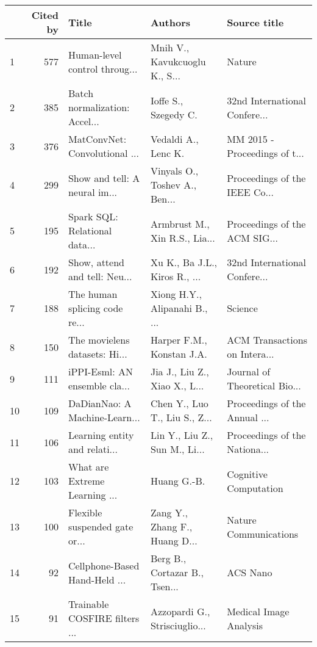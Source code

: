 \begin{tabular}{lrlll}
\toprule
{} &  Cited by &                          Title &                        Authors &                   Source title \\
\midrule
1  &       577 &  Human-level control throug... &  Mnih V., Kavukcuoglu K., S... &                         Nature \\
2  &       385 &  Batch normalization: Accel... &           Ioffe S., Szegedy C. &  32nd International Confere... \\
3  &       376 &  MatConvNet: Convolutional ... &            Vedaldi A., Lenc K. &  MM 2015 - Proceedings of t... \\
4  &       299 &  Show and tell: A neural im... &  Vinyals O., Toshev A., Ben... &  Proceedings of the IEEE Co... \\
5  &       195 &  Spark SQL: Relational data... &  Armbrust M., Xin R.S., Lia... &  Proceedings of the ACM SIG... \\
6  &       192 &  Show, attend and tell: Neu... &  Xu K., Ba J.L., Kiros R., ... &  32nd International Confere... \\
7  &       188 &  The human splicing code re... &  Xiong H.Y., Alipanahi B., ... &                        Science \\
8  &       150 &  The movielens datasets: Hi... &      Harper F.M., Konstan J.A. &  ACM Transactions on Intera... \\
9  &       111 &  iPPI-Esml: AN ensemble cla... &  Jia J., Liu Z., Xiao X., L... &  Journal of Theoretical Bio... \\
10 &       109 &  DaDianNao: A Machine-Learn... &  Chen Y., Luo T., Liu S., Z... &  Proceedings of the Annual ... \\
11 &       106 &  Learning entity and relati... &  Lin Y., Liu Z., Sun M., Li... &  Proceedings of the Nationa... \\
12 &       103 &  What are Extreme Learning ... &                    Huang G.-B. &          Cognitive Computation \\
13 &       100 &  Flexible suspended gate or... &  Zang Y., Zhang F., Huang D... &          Nature Communications \\
14 &        92 &  Cellphone-Based Hand-Held ... &  Berg B., Cortazar B., Tsen... &                       ACS Nano \\
15 &        91 &  Trainable COSFIRE filters ... &  Azzopardi G., Strisciuglio... &         Medical Image Analysis \\
\bottomrule
\end{tabular}

